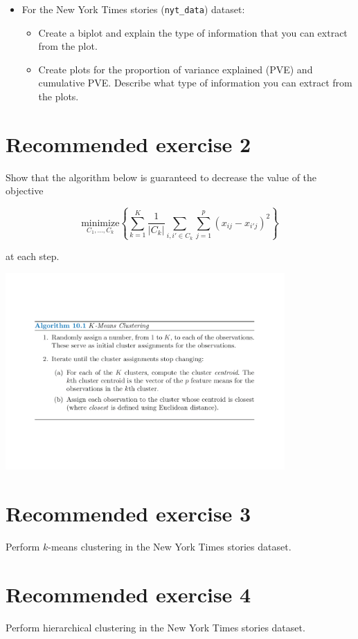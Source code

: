 \documentclass[]{article}
\providecommand{\tightlist}{%
  \setlength{\itemsep}{0pt}\setlength{\parskip}{0pt}}
\begin{document}
\begin{itemize}
\tightlist
\item
  For the New York Times stories (\texttt{nyt\_data}) dataset:

  \begin{itemize}
  \tightlist
  \item
    Create a biplot and explain the type of information that you can
    extract from the plot.
  \item
    Create plots for the proportion of variance explained (PVE) and
    cumulative PVE. Describe what type of information you can extract
    from the plots.
  \end{itemize}
\end{itemize}

\hypertarget{recommended-exercise-2}{%
\section{Recommended exercise 2}\label{recommended-exercise-2}}

Show that the algorithm below is guaranteed to decrease the value of the
objective

\[\underset{C_1, \ldots, C_k}{\text{minimize}}\left\{\sum_{k=1}^{K} \frac{1}{|C_k|} \sum_{i, i' \in C_k} \sum_{j=1}^{p}(x_{ij} - x_{i'j})^2 \right\}\]

at each step.

\center

\includegraphics[width=0.8\textwidth,height=\textheight]{kmeans_algo.pdf}

\flushleft

\hypertarget{recommended-exercise-3}{%
\section{Recommended exercise 3}\label{recommended-exercise-3}}

Perform \(k\)-means clustering in the New York Times stories dataset.

\hypertarget{recommended-exercise-4}{%
\section{Recommended exercise 4}\label{recommended-exercise-4}}

Perform hierarchical clustering in the New York Times stories dataset.
\end{document}
